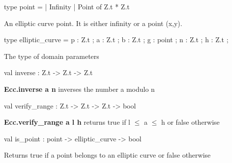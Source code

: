 \documentclass[12pt]{article}
\begin{document}
\begin{ocamldocsigend}


\label{type:Ecc.Ecc.point}\begin{ocamldoccode}
type point =
  | Infinity
  | Point of Z.t * Z.t
\end{ocamldoccode}
\begin{ocamldocdescription}
An elliptic curve point. It is either infinity or a point (x,y).
\end{ocamldocdescription}


\label{type:Ecc.Ecc.elliptic-underscorecurve}\begin{ocamldoccode}
type elliptic_curve = {}
  p : Z.t ;
  a : Z.t ;
  b : Z.t ;
  g : point ;
  n : Z.t ;
  h : Z.t ;
{}
\end{ocamldoccode}
\begin{ocamldocdescription}
The type of domain parameters
\end{ocamldocdescription}

\label{val:Ecc.Ecc.inverse}\begin{ocamldoccode}
val inverse : Z.t -> Z.t -> Z.t
\end{ocamldoccode}
\begin{ocamldocdescription}
\textbf{Ecc.inverse a n} inverses the number a modulo n
\end{ocamldocdescription}


\label{val:Ecc.Ecc.verify-underscorerange}\begin{ocamldoccode}
val verify_range : Z.t -> Z.t -> Z.t -> bool
\end{ocamldoccode}
\begin{ocamldocdescription}
\textbf{Ecc.verify\_range a l h} returns true if l $\leq$ a $\leq$ h or false otherwise


\end{ocamldocdescription}


\label{val:Ecc.Ecc.is-underscorepoint}\begin{ocamldoccode}
val is_point : point -> elliptic_curve -> bool
\end{ocamldoccode}
\begin{ocamldocdescription}
Returns true if a point belongs to an elliptic curve or false otherwise


\end{ocamldocdescription}



\end{ocamldocsigend}
\end{document}
